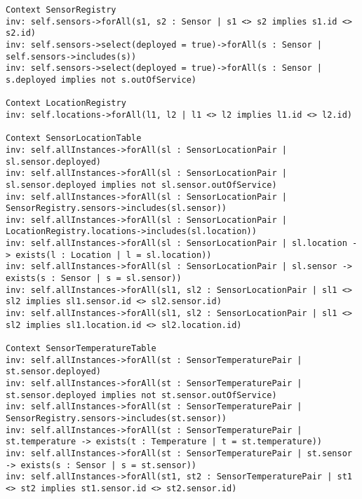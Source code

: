 \documentclass{article}
\begin{document}
\begin{lstlisting}[caption={Requirements pt2}]
Context SensorRegistry
inv: self.sensors->forAll(s1, s2 : Sensor | s1 <> s2 implies s1.id <> s2.id)
inv: self.sensors->select(deployed = true)->forAll(s : Sensor | self.sensors->includes(s))
inv: self.sensors->select(deployed = true)->forAll(s : Sensor | s.deployed implies not s.outOfService)

Context LocationRegistry
inv: self.locations->forAll(l1, l2 | l1 <> l2 implies l1.id <> l2.id)

Context SensorLocationTable
inv: self.allInstances->forAll(sl : SensorLocationPair | sl.sensor.deployed)
inv: self.allInstances->forAll(sl : SensorLocationPair | sl.sensor.deployed implies not sl.sensor.outOfService)
inv: self.allInstances->forAll(sl : SensorLocationPair | SensorRegistry.sensors->includes(sl.sensor))
inv: self.allInstances->forAll(sl : SensorLocationPair | LocationRegistry.locations->includes(sl.location))
inv: self.allInstances->forAll(sl : SensorLocationPair | sl.location -> exists(l : Location | l = sl.location))
inv: self.allInstances->forAll(sl : SensorLocationPair | sl.sensor -> exists(s : Sensor | s = sl.sensor))
inv: self.allInstances->forAll(sl1, sl2 : SensorLocationPair | sl1 <> sl2 implies sl1.sensor.id <> sl2.sensor.id)
inv: self.allInstances->forAll(sl1, sl2 : SensorLocationPair | sl1 <> sl2 implies sl1.location.id <> sl2.location.id)

Context SensorTemperatureTable
inv: self.allInstances->forAll(st : SensorTemperaturePair | st.sensor.deployed)
inv: self.allInstances->forAll(st : SensorTemperaturePair | st.sensor.deployed implies not st.sensor.outOfService)
inv: self.allInstances->forAll(st : SensorTemperaturePair | SensorRegistry.sensors->includes(st.sensor))
inv: self.allInstances->forAll(st : SensorTemperaturePair | st.temperature -> exists(t : Temperature | t = st.temperature))
inv: self.allInstances->forAll(st : SensorTemperaturePair | st.sensor -> exists(s : Sensor | s = st.sensor))
inv: self.allInstances->forAll(st1, st2 : SensorTemperaturePair | st1 <> st2 implies st1.sensor.id <> st2.sensor.id)

\end{lstlisting}
\end{document}

